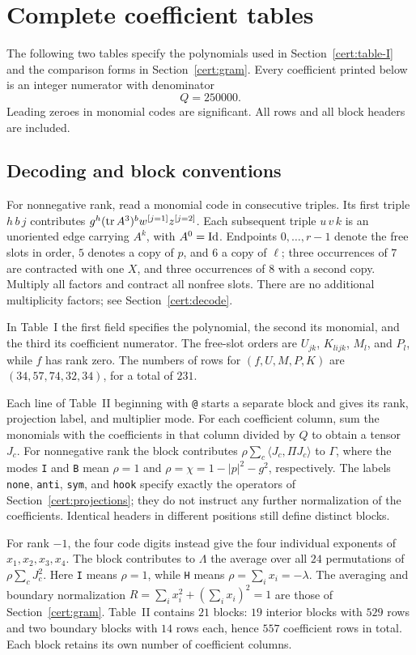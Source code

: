 \section{Complete coefficient tables}\label{app:tables}

The following two tables specify the polynomials used in
Section~\ref{cert:table-I} and the comparison forms in
Section~\ref{cert:gram}. Every coefficient printed below is an integer
numerator with denominator
\[
Q=250000.
\]
Leading zeroes in monomial codes are significant. All rows and all block
headers are included.

\subsection{Decoding and block conventions}\label{app:decoding}
For nonnegative rank, read a monomial code in consecutive triples.
Its first triple $h\,b\,j$ contributes
$g^h(\operatorname{tr} A^3)^b w^{[j=1]}z^{[j=2]}$.
Each subsequent triple $u\,v\,k$ is an unoriented edge carrying $A^k$,
with $A^0=\operatorname{Id}$. Endpoints $0,\ldots,r-1$ denote the free slots in order,
$5$ denotes a copy of $p$, and $6$ a copy of $\ell$;
three occurrences of $7$ are contracted with one $X$,
and three occurrences of $8$ with a second copy.
Multiply all factors and contract all nonfree slots.
There are no additional multiplicity factors; see
Section~\ref{cert:decode}.

In Table~I the first field specifies the polynomial, the second its monomial,
and the third its coefficient numerator. The free-slot orders are
$U_{jk}$, $K_{lijk}$, $M_l$, and $P_l$, while $f$ has rank zero.
The numbers of rows for $(f,U,M,P,K)$ are $(34,57,74,32,34)$,
for a total of $231$.

Each line of Table~II beginning with \texttt{@} starts a separate block
and gives its rank, projection label, and multiplier mode.
For each coefficient column, sum the monomials with the coefficients
in that column divided by $Q$ to obtain a tensor $J_c$.
For nonnegative rank the block contributes
$\rho\sum_c\langle J_c,\Pi J_c\rangle$ to $\Gamma$,
where the modes \texttt{I} and \texttt{B} mean
$\rho=1$ and $\rho=\chi=1-|p|^2-g^2$, respectively.
The labels \texttt{none}, \texttt{anti}, \texttt{sym}, and \texttt{hook}
specify exactly the operators of Section~\ref{cert:projections};
they do not instruct any further normalization of the coefficients.
Identical headers in different positions still define distinct blocks.

For rank $-1$, the four code digits instead give the four individual
exponents of $x_1,x_2,x_3,x_4$. The block contributes to $\Lambda$
the average over all $24$ permutations of
$\rho\sum_c J_c^2$.
Here \texttt{I} means $\rho=1$, while \texttt{H} means
$\rho=\sum_i x_i=-\lambda$.
The averaging and boundary normalization
$R=\sum_i x_i^2+(\sum_i x_i)^2=1$ are those of
Section~\ref{cert:gram}.
Table~II contains $21$ blocks: $19$ interior blocks with $529$ rows and
two boundary blocks with $14$ rows each, hence $557$ coefficient rows
in total. Each block retains its own number of coefficient columns.

